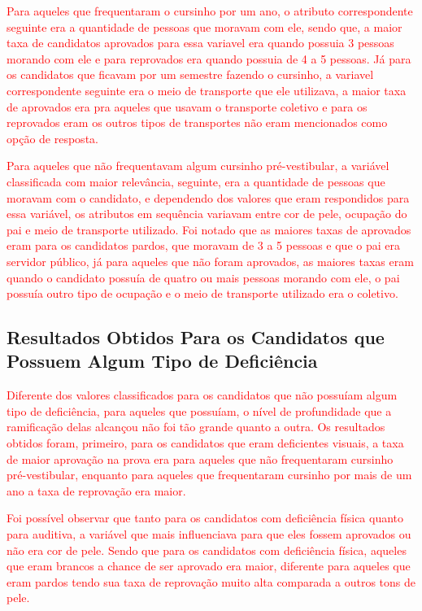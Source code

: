 \par
\textcolor{red}{Para aqueles que frequentaram o cursinho por um ano, o atributo correspondente seguinte era a quantidade de pessoas que moravam com ele, sendo que, a maior taxa de candidatos aprovados para essa variavel era quando possuia 3 pessoas morando com ele e para reprovados era quando possuia de 4 a 5 pessoas. Já para os candidatos que ficavam por um semestre fazendo o cursinho, a variavel correspondente seguinte era o meio de transporte que ele utilizava, a maior taxa de aprovados era pra aqueles que usavam o transporte coletivo e para os reprovados eram os outros tipos de transportes não eram mencionados como opção de resposta.}

\par
\textcolor{red}{Para aqueles que não frequentavam algum cursinho pré-vestibular, a variável classificada com maior relevância, seguinte, era a quantidade de pessoas que moravam com o candidato, e dependendo dos valores que eram respondidos para essa variável, os atributos em sequência variavam entre cor de pele, ocupação do pai e meio de transporte utilizado. Foi notado que as maiores taxas de aprovados eram para os candidatos pardos, que moravam de 3 a 5 pessoas e que o pai era servidor público, já para aqueles que não foram aprovados, as maiores taxas eram quando o candidato possuía de quatro ou mais pessoas morando com ele, o pai possuía outro tipo de ocupação e o meio de transporte utilizado era o coletivo.}


\subsection{Resultados Obtidos Para os Candidatos que Possuem Algum Tipo de Deficiência}


\par
\textcolor{red}{Diferente dos valores classificados para os candidatos que não possuíam algum tipo de deficiência, para aqueles que possuíam, o nível de profundidade que a ramificação delas alcançou não foi tão grande quanto a outra. Os resultados obtidos foram, primeiro, para os candidatos que eram deficientes visuais, a taxa de maior aprovação na prova era para aqueles que não frequentaram cursinho pré-vestibular, enquanto para aqueles que frequentaram cursinho por mais de um ano a taxa de reprovação era maior.}

\par
\textcolor{red}{Foi possível observar que tanto para os candidatos com deficiência física quanto para auditiva, a variável que mais influenciava para que eles fossem aprovados ou não era cor de pele. Sendo que para os candidatos com deficiência física, aqueles que eram brancos a chance de ser aprovado era maior, diferente para aqueles que eram pardos tendo sua taxa de reprovação muito alta comparada a outros tons de pele.}

